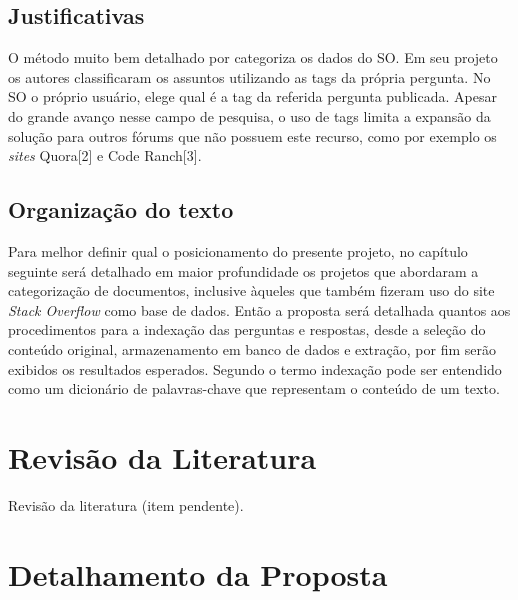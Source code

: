 \documentclass[10pt,a4paper,final]{article}
\begin{document}
    \subsection{Justificativas}

O método muito bem detalhado por \cite{Arash2016} categoriza os dados do SO. Em seu projeto os autores classificaram os assuntos utilizando as tags da própria pergunta. No SO o próprio usuário, elege qual é a tag da referida pergunta publicada. Apesar do grande avanço nesse campo de pesquisa, o uso de tags limita a expansão da solução para outros fórums que não possuem este recurso, como por exemplo os \textit{sites} Quora[2] e Code Ranch[3].

   \subsection{Organização do texto}

Para melhor definir qual o posicionamento do presente projeto, no capítulo seguinte será detalhado em maior profundidade os projetos que abordaram a categorização de documentos, inclusive àqueles que também fizeram uso do site \textit{Stack Overflow} como base de dados. Então a proposta será detalhada quantos aos procedimentos para a indexação das perguntas e respostas, desde a seleção do conteúdo original, armazenamento em banco de dados e extração, por fim serão exibidos os resultados esperados. Segundo \cite{Kaleta2014} o termo indexação pode ser entendido como um dicionário de palavras-chave que representam o conteúdo de um texto.	

 \section{Revisão da Literatura}
   Revisão da literatura (item pendente).


 \section{Detalhamento da Proposta}
\end{document}
